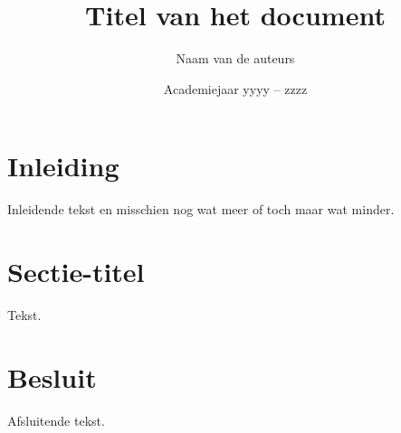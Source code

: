 \documentclass[a4paper,kulak]{kulakarticle} %
\date{Academiejaar yyyy -- zzzz}
\title{Titel van het document}
\author{Naam van de auteurs}
\begin{document}
\maketitle

\section*{Inleiding}

Inleidende tekst en misschien nog wat meer of toch maar wat minder.

\section{Sectie-titel}

Tekst.

\section*{Besluit}

Afsluitende tekst.
\end{document}
